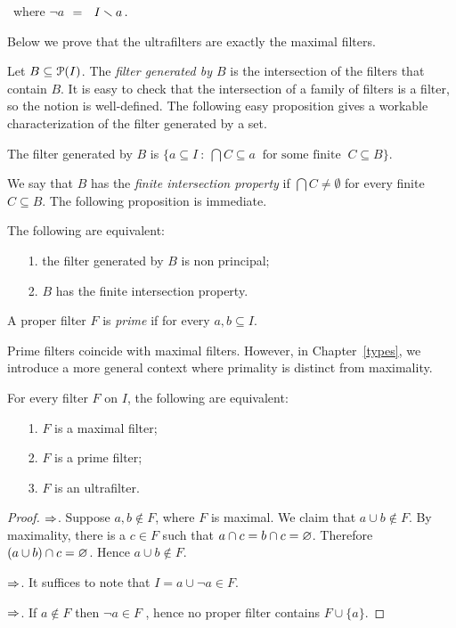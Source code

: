 \, \hfill where \emph{$\neg a$}$\ \ =\ \ I\sm a\, .$

Below we prove that the ultrafilters are exactly the maximal filters.

Let $B\subseteq\P(I)$. The \emph{filter generated by $B$\/} is the intersection of the filters that contain $B$.
It is easy to check that the intersection of a family of filters is a filter, so the notion is well-defined.
The following easy proposition gives a workable characterization of the filter generated by a set.

\begin{proposition} 
  The filter generated by $B$ is $\big\{a\subseteq I\ :\ \bigcap C\subseteq a\ \textrm{ for some finite }\ C\subseteq B\big\}$.
\end{proposition}

We say that $B$ has the \emph{finite intersection property\/} if $\bigcap C\neq\emptyset$ for every finite $C\subseteq B$. The following proposition is immediate.

\begin{proposition} The following are equivalent:
\begin{itemize}
\item[1.] the filter generated by $B$ is non principal;
\item[2.] $B$ has the finite intersection property.
\end{itemize}
\end{proposition}

A proper filter $F$ is \emph{prime\/} if for every $a,b\subseteq I$.


Prime filters coincide with maximal filters. 
However, in Chapter~\ref{types}, we introduce a more general context where primality is distinct from maximality.

\begin{proposition}
For every filter $F$ on $I$, the following are equivalent:
\begin{itemize}
\item[1.] $F$ is a maximal filter;
\item[2.] $F$ is a prime filter;
\item[3.] $F$ is an ultrafilter.
\end{itemize}
\end{proposition}
\begin{proof}
$\IMP$. Suppose $a,b\notin F$, where $F$ is maximal.
We claim that $a\cup b\notin F$.
By maximality, there is a $c\in F$ such that $a\cap c= b\cap c= \0$.
Therefore $(a\cup b)\cap c= \0$.
Hence  $a\cup b\notin F$. 

$\IMP$. It suffices to note that $I=a\cup \neg a\in F$. 

$\IMP$. If $a\notin F$ then $\neg a\in F$ , hence no proper filter contains $F\cup\{a\}$.
\end{proof}

